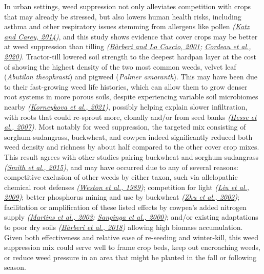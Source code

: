 \documentclass[
  12pt,
]{article}
\begin{document}
In urban settings, weed suppression not only alleviates competition with crops that may already be stressed, but also lowers human health risks, including asthma and other respiratory issues stemming from allergens like pollen \emph{(\protect\hyperlink{ref-katz14}{Katz and Carey, 2014})}, and this study shows evidence that cover crops may be better at weed suppression than tilling \emph{(\protect\hyperlink{ref-barberi01}{Bàrberi and Lo Cascio, 2001}; \protect\hyperlink{ref-cordeau20}{Cordeau et al., 2020})}.
Tractor-till lowered soil strength to the deepest hardpan layer at the cost of showing the highest density of the two most common weeds, velvet leaf (\emph{Abutilon theophrasti}) and pigweed (\emph{Palmer amaranth}).
This may have been due to their fast-growing weed life histories, which can allow them to grow denser root systems in more porous soils, despite experiencing variable soil microbiomes nearby \emph{(\protect\hyperlink{ref-korneykova21}{Korneykova et al., 2021})}, possibly helping explain slower infiltration, with roots that could re-sprout more, clonally and/or from seed banks \emph{(\protect\hyperlink{ref-hesse07}{Hesse et al., 2007})}.
Most notably for weed suppression, the targeted mix consisting of sorghum-sudangrass, buckwheat, and cowpea indeed significantly reduced both weed density and richness by about half compared to the other cover crop mixes.
This result agrees with other studies pairing buckwheat and sorghum-sudangrass \emph{(\protect\hyperlink{ref-smith15}{Smith et al., 2015})}, and may have occurred due to any of several reasons:
competitive exclusion of other weeds by either taxon, such via allelopathic chemical root defenses \emph{(\protect\hyperlink{ref-weston89}{Weston et al., 1989})};
competition for light \emph{(\protect\hyperlink{ref-liu09b}{Liu et al., 2009})};
better phosphorus mining and use by buckwheat \emph{(\protect\hyperlink{ref-zhu02}{Zhu et al., 2002})};
facilitation or amplification of these listed effects by cowpea's added nitrogen supply \emph{(\protect\hyperlink{ref-martins03}{Martins et al., 2003}; \protect\hyperlink{ref-sanginga00}{Sanginga et al., 2000})};
and/or existing adaptations to poor dry soils \emph{(\protect\hyperlink{ref-barberi18}{Bàrberi et al., 2018})} allowing high biomass accumulation.
Given both effectiveness and relative ease of re-seeding and winter-kill, this weed suppression mix could serve well to frame crop beds, keep out encroaching weeds, or reduce weed pressure in an area that might be planted in the fall or following season.
\end{document}
